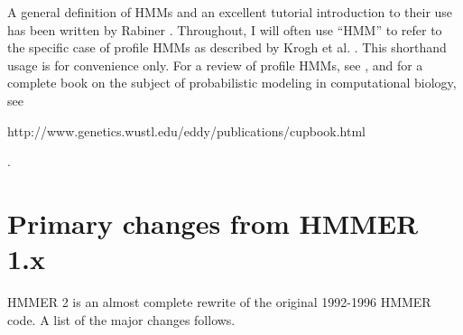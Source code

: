 A general definition of HMMs and an excellent tutorial introduction to
their use has been written by Rabiner \cite{Rabiner89}. Throughout, I
will often use ``HMM'' to refer to the specific case of profile HMMs
as described by Krogh et al. \cite{Krogh94}. This shorthand usage is
for convenience only. For a review of profile HMMs, see \cite{Eddy96},
and for a complete book on the subject of probabilistic modeling in
computational biology, see \cite{Durbin98} 
\begin{htmlonly}
{http://www.genetics.wustl.edu/eddy/publications/cupbook.html}
\end{htmlonly}.

\section{Primary changes from HMMER 1.x}

HMMER 2 is an almost complete rewrite of the original 1992-1996 HMMER
code. A list of the major changes follows.

